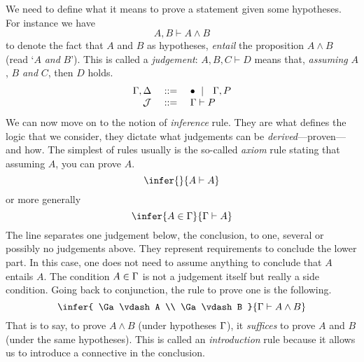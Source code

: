 We need to define what it means to prove a statement given some hypotheses.
For instance we have
\[
  A, B \vdash A \wedge B
\]
to denote the fact that \(A\) and \(B\) as hypotheses, \emph{entail} the
proposition \(A \wedge B\) (read `\(A\) \emph{and} \(B\)').
This is called a \emph{judgement}: \(A, B, C \vdash D\) means that,
\emph{assuming} \(A\), \(B\) \emph{and} \(C\), then \(D\) holds.
\[
  \begin{array}{rcl}
    \Gamma, \Delta &\ \mathrel{{:}{:}{=}}\ & \bullet \ \mid\ \  \Gamma, P \\
    \mathcal{J} &\ \mathrel{{:}{:}{=}}\ & \Gamma \vdash P
  \end{array}
\]
We can now move on to the notion of \emph{inference} rule. They are what defines
the logic that we consider, they dictate what judgements can be
\emph{derived}---\ie proven---and how.
The simplest of rules usually is the so-called \emph{axiom} rule stating that
assuming \(A\), you can prove \(A\).
\[
  \infer
    { }
    {A \vdash A}
\]
or more generally
\[
  \infer
    {A \in \Ga}
    {\Ga \vdash A}
\]
The line separates one judgement below, the conclusion, to one, several or
possibly no judgements above. They represent requirements to conclude the lower
part. In this case, one does not need to assume anything to conclude that \(A\)
entails \(A\). The condition \(A \in \Gamma\) is not a judgement itself but really
a side condition.
Going back to conjunction, the rule to prove one is the following.
\[
  \infer
    {
      \Ga \vdash A \\
      \Ga \vdash B
    }
    {\Ga \vdash A \wedge B}
\]
That is to say, to prove \(A \wedge B\) (under hypotheses \(\Gamma\)), it
\emph{suffices} to prove \(A\) and \(B\) (under the same hypotheses).
This is called an \emph{introduction} rule because it allows us to introduce a
connective in the conclusion.
